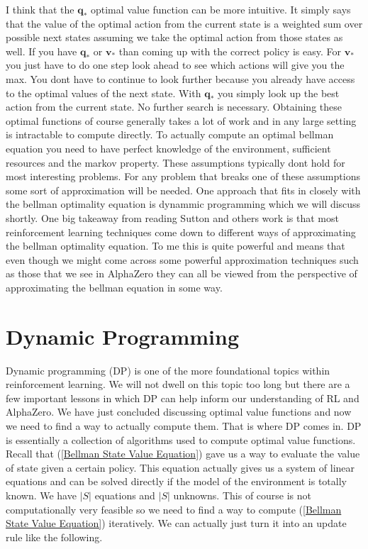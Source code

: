 I think that the $\mathbf{q_{*}}$ optimal value function can be more intuitive. It simply says that the value of the optimal action from the current state is a weighted sum over possible next states assuming we take the optimal action from those states as well. If you have $\mathbf{q_{*}}$ or $\mathbf{v_{*}}$ than coming up with the correct policy is easy. For $\mathbf{v_{*}}$ you just have to do one step look ahead to see which actions will give you the max. You dont have to continue to look further because you already have access to the optimal values of the next state. With $\mathbf{q_{*}}$ you simply look up the best action from the current state. No further search is necessary. Obtaining these optimal functions of course generally takes a lot of work and in any large setting is intractable to compute directly. To actually compute an optimal bellman equation you need to have perfect knowledge of the environment, sufficient resources and the markov property. These assumptions typically dont hold for most interesting problems. For any problem that breaks one of these assumptions some sort of approximation will be needed. One approach that fits in closely with the bellman optimality equation is dynammic programming which we will discuss shortly. One big takeaway from reading Sutton and others work is that most reinforcement learning techniques come down to different ways of approximating the bellman optimality equation. To me this is quite powerful and means that even though we might come across some powerful approximation techniques such as those that we see in AlphaZero they can all be viewed from the perspective of approximating the bellman equation in some way. 

\section{Dynamic Programming}

Dynamic programming (DP) is one of the more foundational topics within reinforcement learning. We will not dwell on this topic too long but there are a few important lessons in which DP can help inform our understanding of RL and AlphaZero. We have just concluded discussing optimal value functions and now we need to find a way to actually compute them. That is where DP comes in. DP is essentially a collection of algorithms used to compute optimal value functions. Recall that (\ref{Bellman State Value Equation}) gave us a way to evaluate the value of state given a certain policy. This equation actually gives us a system of linear equations and can be solved directly if the model of the environment is totally known. We have $|S|$ equations and $|S|$ unknowns. This of course is not computationally very feasible so we need to find a way to compute (\ref{Bellman State Value Equation}) iteratively. We can actually just turn it into an update rule like the following. 

